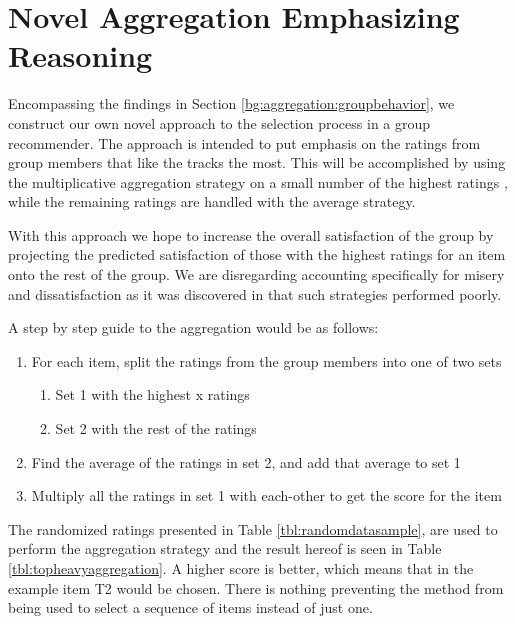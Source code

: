 \section{Novel Aggregation Emphasizing Reasoning}
Encompassing the findings in Section \ref{bg:aggregation:groupbehavior}, we construct our own novel approach to the selection process in a group recommender. The approach is intended to put emphasis on the ratings from group members that like the tracks the most. This will be accomplished by using the multiplicative aggregation strategy on a small number of the highest ratings , while the remaining ratings are handled with the average strategy.

With this approach we hope to increase the overall satisfaction of the group by projecting the predicted satisfaction of those with the highest ratings for an item onto the rest of the group. We are disregarding accounting specifically for misery and dissatisfaction as it was discovered in \cite{d}  that such strategies performed poorly.

A step by step guide to the aggregation would be as follows:
\begin{enumerate}
	\item For each item, split the ratings from the group members into one of two sets
	\begin{enumerate}
		\item Set 1 with the highest x ratings
		\item Set 2 with the rest of the ratings
	\end{enumerate}
	\item Find the average of the ratings in set 2, and add that average to set 1
	\item Multiply all the ratings in set 1 with each-other to get the score for the item
\end{enumerate}

The randomized ratings presented in Table \ref{tbl:randomdatasample}, are used to perform the aggregation strategy and the result hereof is seen in Table \ref{tbl:topheavyaggregation}. A higher score is better, which means that in the example item T2 would be chosen. There is nothing preventing the method from being used to select a sequence of items instead of just one.

